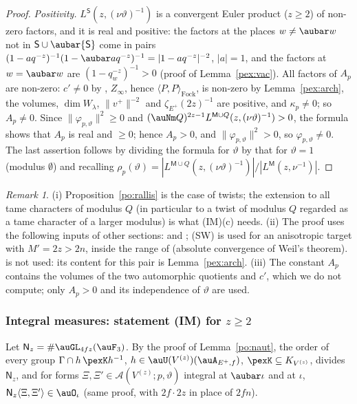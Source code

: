\documentclass[10pt]{amsart}
\theoremstyle{definition}
\theoremstyle{remark}
\newtheorem{remark}[theorem]{Remark}
\begin{document}
\begin{proof}
\emph{Positivity.} $L^{\mathsf S}(z,(\nu\vartheta)^{-1})$ is a convergent Euler product ($z\ge2$) of
non-zero factors, and it is real and positive: the factors at the places $w\ne\aubar w$ not in
$\mathsf S\cup\aubar{\mathsf S}$ come in pairs $(1-aq^{-z})^{-1}(1-\aubar aq^{-z})^{-1}=|1-aq^{-z}|^{-2}$,
$|a|=1$, and the factors at $w=\aubar w$ are $(1-q_w^{-z})^{-1}>0$ (proof of Lemma~\ref{pex:vac}).
All factors of $A_p$ are non-zero: $c'\ne0$ by {\cite[Lemma~2.14(b)]{P53}},
$Z_\infty$, hence $\langle P,P\rangle_{\mathrm{Fock}}$, is non-zero by Lemma~\ref{pex:arch}, the volumes,
$\dim W_\lambda$, $\|v^+\|^{-2}$ and $\zeta_{E^+}(2z)^{-1}$ are positive, and $\kappa_p\ne0$; so $A_p\ne0$.
Since $\|\varphi_{p,\vartheta}\|^2\ge0$ and $(\auNm Q)^{2z-1}L^{\mathsf M\cup Q}(z,(\nu\vartheta)^{-1})>0$,
the formula shows that $A_p$ is real and $\ge0$; hence $A_p>0$, and $\|\varphi_{p,\vartheta}\|^2>0$, so $\varphi_{p,\vartheta}
\ne0$. The last assertion follows by dividing the formula for $\vartheta$ by that for $\vartheta=1$
(modulus $\emptyset$) and recalling $\rho_p(\vartheta)=|L^{\mathsf M\cup Q}(z,(\nu\vartheta)^{-1})|/
|L^{\mathsf M}(z,\nu^{-1})|$.
\end{proof}

\begin{remark}\label{pex:rem-rallis}
(i) Proposition~\ref{po:rallis} is the case of twists; the extension to all
tame characters of modulus $Q$ (in particular to a twist of modulus $Q$ regarded as a tame
character of a larger modulus) is what (IM)(c) needs. (ii) The proof uses the following inputs of
other sections: {\cite[Proposition~2.16]{P53}} and {\cite[Lemmas~2.13, 2.14 and~2.18]{P53}};
(SW) is used for an anisotropic target
with $M'=2z>2n$, inside the range of {\cite[Lemma~2.13]{P53}} (absolute convergence of Weil's theorem). {\cite[Lemma~2.10]{P53}} is not used: its
content for this pair is Lemma~\ref{pex:arch}. (iii) The constant $A_p$ contains the volumes of the
two automorphic quotients and $c'$, which we do not compute; only $A_p>0$ and its independence of
$\vartheta$ are used.
\end{remark}

\subsubsection{Integral measures: statement {\rm(IM)} for $z\ge2$}\label{pex:ss-IM}

Let $\mathsf N_z=\#\auGL_{4fz}(\auF_3)$. By the proof of Lemma~\ref{po:naut}, the order of every
group $\Gamma\cap h\,\pexK h^{-1}$, $h\in\auU(V^{(z)})(\auA_{E^+,f})$, $\pexK\subseteq K_{V^{(z)}}$, divides
$\mathsf N_z$, and for forms $\Xi,\Xi'\in\mathcal A(V^{(z)};p,\vartheta)$ integral at $\aubar\iota$
and at $\iota$, $\mathsf N_z\langle\Xi,\Xi'\rangle\in\auO_\iota$ (same proof, with
$2f\cdot2z$ in place of $2fn$).
\end{document}
